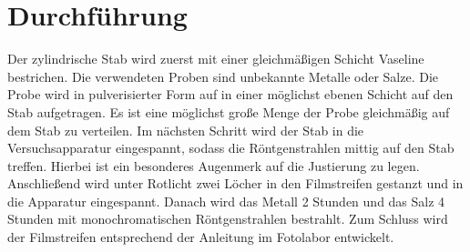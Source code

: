 \section{Durchführung}
\label{sec:Durchführung}
Der zylindrische Stab wird zuerst mit einer gleichmäßigen Schicht Vaseline bestrichen.
 Die verwendeten Proben sind unbekannte Metalle oder Salze. Die Probe wird in pulverisierter
  Form auf in einer möglichst ebenen Schicht auf den Stab aufgetragen. Es ist eine möglichst
   große Menge der Probe gleichmäßig auf dem Stab zu verteilen. Im nächsten Schritt
    wird der Stab in die Versuchsapparatur eingespannt, sodass die Röntgenstrahlen
     mittig auf den Stab treffen. Hierbei ist ein besonderes Augenmerk auf die Justierung zu legen.
      Anschließend wird unter Rotlicht zwei Löcher in den Filmstreifen gestanzt und in die Apparatur eingespannt.
       Danach wird das Metall 2 Stunden und das Salz 4 Stunden mit monochromatischen Röntgenstrahlen bestrahlt.
       Zum Schluss wird der Filmstreifen entsprechend der Anleitung im Fotolabor entwickelt.
